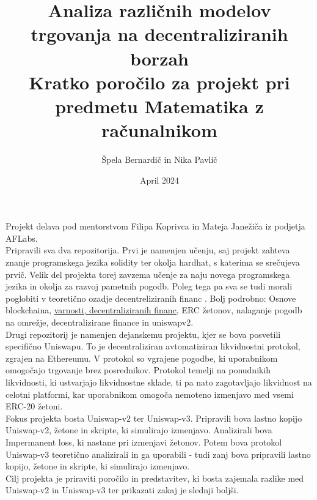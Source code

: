 \documentclass[a4paper,12pt]{article}%
\title{Analiza različnih modelov trgovanja na decentraliziranih borzah \\ \large Kratko poročilo za projekt pri predmetu Matematika z računalnikom}
\date{April 2024}
\author{Špela Bernardič in Nika Pavlič}
\begin{document}
\maketitle

Projekt delava pod mentorstvom Filipa Koprivca in Mateja Janežiča iz podjetja AFLabs. \\

Pripravili sva dva repozitorija. Prvi je namenjen učenju, saj projekt zahteva znanje programskega jezika solidity ter okolja hardhat, s katerima se srečujeva prvič. Velik del projekta torej zavzema učenje za naju novega programskega jezika in okolja za razvoj pametnih pogodb. Poleg tega pa sva se tudi morali poglobiti v teoretično ozadje decentreliziranih financ . Bolj podrobno: Osnove blockchaina, \underline{varnosti, decentraliziranih financ,} ERC žetonov, nalaganje pogodb na omrežje, decentralizirane finance in uniswapv2.\\

Drugi repozitorij je namenjen dejanskemu projektu, kjer se bova posvetili specifično Uniswapu. To je decentraliziran avtomatiziran likvidnostni protokol, zgrajen na Ethereumu. V protokol so vgrajene pogodbe, ki uporabnikom omogočajo trgovanje brez posrednikov. Protokol temelji na ponudnikih likvidnosti, ki ustvarjajo likvidnostne sklade, ti pa nato zagotavljajo likvidnost na celotni platformi, kar uporabnikom omogoča nemoteno izmenjavo med vsemi ERC-20 žetoni. \\

Fokus projekta bosta Uniswap-v2 ter Uniswap-v3. Pripravili bova lastno kopijo Uniswap-v2,  žetone in skripte, ki simulirajo izmenjavo. Analizirali bova Impermanent loss, ki nastane pri izmenjavi žetonov. Potem bova protokol Uniswap-v3 teoretično analizirali in ga uporabili - tudi zanj bova pripravili lastno kopijo, žetone in skripte, ki simulirajo izmenjavo. \\

Cilj projekta je priraviti poročilo in predstavitev, ki bosta zajemala razlike med Uniswap-v2 in Uniswap-v3 ter prikazati zakaj je slednji boljši. 
\end{document}
